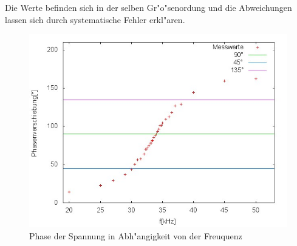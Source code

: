 	Die Werte befinden sich in der selben Gr"o"senordung und die Abweichungen lassen sich durch systematische Fehler erkl"aren.

\clearpage
	\begin{figure}[H]
		\centering
		\includegraphics[width = 12cm]{img/graph_d.jpg}
		\caption{Phase der Spannung in Abh"angigkeit von der Freuquenz}
		\label{phase}
	\end{figure}

	
